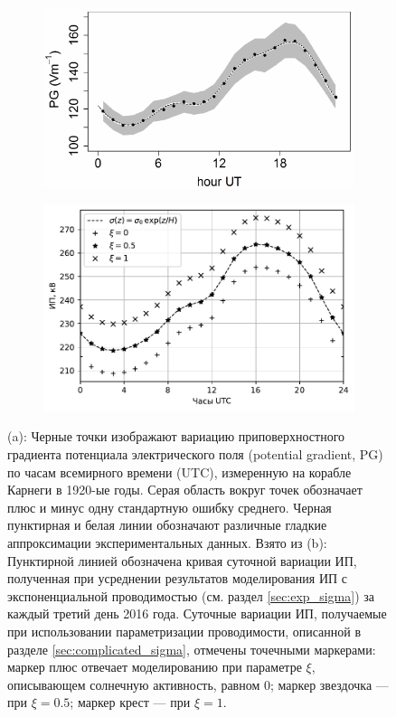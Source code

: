 \begin{figure}  
    \centering
    \begin{subfigure}[t]{.49\textwidth}
		\centering
		\includegraphics[width=\linewidth]{figures/carnegie_curve.png}
		\caption{}
		\label{fig:carnegie_curve}  
    \end{subfigure}
    \hfill
    \begin{subfigure}[t]{.49\textwidth}
		\centering
		\includegraphics[width=\linewidth]{figures/ip_differences.pdf}
		\caption{}
		\label{fig:ip_differences}  
     \end{subfigure}
     \caption{(a): Черные точки изображают вариацию приповерхностного градиента потенциала электрического поля (potential gradient, PG) по часам всемирного времени (UTC), измеренную на корабле Карнеги в 1920-ые годы. Серая область вокруг точек обозначает плюс и минус одну стандартную ошибку среднего. Черная пунктирная и белая линии обозначают различные гладкие аппроксимации экспериментальных данных. Взято из \cite[Рис. 6a]{Harrison_2012} (b): Пунктирной линией обозначена кривая суточной вариации ИП, полученная при усреднении результатов моделирования ИП с экспоненциальной проводимостью (см. раздел \ref{sec:exp_sigma}) за каждый третий день 2016 года. Суточные вариации ИП, получаемые при использовании параметризации проводимости, описанной в разделе \ref{sec:complicated_sigma}, отмечены точечными маркерами: маркер плюс отвечает моделированию при параметре $\xi$, описывающем солнечную активность, равном 0; маркер звездочка --- при $\xi = 0.5$; маркер крест --- при $\xi = 1$.}
	\label{fig:variations-1}  
\end{figure}

